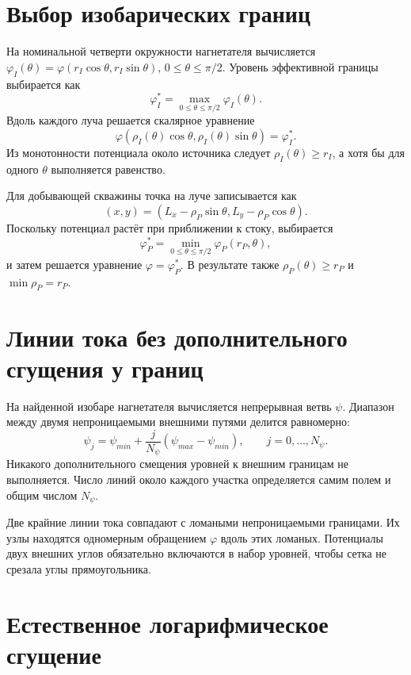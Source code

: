 \documentclass[12pt,a4paper]{article}
\begin{document}
\section{Выбор изобарических границ}

На номинальной четверти окружности нагнетателя вычисляется
$\varphi_I(\theta)=\varphi(r_I\cos\theta,r_I\sin\theta)$,
$0\le\theta\le\pi/2$. Уровень эффективной границы выбирается как
\begin{equation}
 \varphi_I^*=\max_{0\le\theta\le\pi/2}\varphi_I(\theta).
 \label{eq:injector-level}
\end{equation}
Вдоль каждого луча решается скалярное уравнение
\[
 \varphi(\rho_I(\theta)\cos\theta,
         \rho_I(\theta)\sin\theta)=\varphi_I^*.
\]
Из монотонности потенциала около источника следует
$\rho_I(\theta)\ge r_I$, а хотя бы для одного $\theta$ выполняется равенство.

Для добывающей скважины точка на луче записывается как
\[
 (x,y)=(L_x-\rho_P\sin\theta,L_y-\rho_P\cos\theta).
\]
Поскольку потенциал растёт при приближении к стоку, выбирается
\begin{equation}
 \varphi_P^*=\min_{0\le\theta\le\pi/2}\varphi_P(r_P,\theta),
 \label{eq:producer-level}
\end{equation}
и затем решается уравнение $\varphi=\varphi_P^*$. В результате также
$\rho_P(\theta)\ge r_P$ и $\min\rho_P=r_P$.

\section{Линии тока без дополнительного сгущения у границ}

На найденной изобаре нагнетателя вычисляется непрерывная ветвь $\psi$.
Диапазон между двумя непроницаемыми внешними путями делится равномерно:
\begin{equation}
 \psi_j=\psi_{min}+\frac{j}{N_\psi}
 (\psi_{max}-\psi_{min}),\qquad j=0,\ldots,N_\psi.
 \label{eq:psi-levels}
\end{equation}
Никакого дополнительного смещения уровней к внешним границам не выполняется.
Число линий около каждого участка определяется самим полем и общим числом
$N_\psi$.

Две крайние линии тока совпадают с ломаными непроницаемыми границами. Их узлы
находятся одномерным обращением $\varphi$ вдоль этих ломаных. Потенциалы двух
внешних углов обязательно включаются в набор уровней, чтобы сетка не срезала
углы прямоугольника.

\section{Естественное логарифмическое сгущение}
\end{document}
